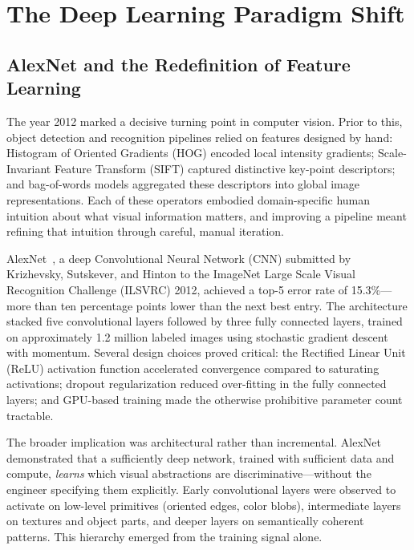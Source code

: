 

\section{The Deep Learning Paradigm Shift}

\subsection{AlexNet and the Redefinition of Feature Learning}

The year 2012 marked a decisive turning point in computer vision.
Prior to this, object detection and recognition pipelines relied
on features designed by hand: Histogram of Oriented Gradients
(HOG) encoded local intensity gradients; Scale-Invariant Feature
Transform (SIFT) captured distinctive key-point descriptors;
and bag-of-words models aggregated these descriptors into global
image representations. Each of these operators embodied
domain-specific human intuition about what visual information
matters, and improving a pipeline meant refining that intuition
through careful, manual iteration.

AlexNet~\cite{krizhevsky2012alexnet}, a deep Convolutional Neural
Network (CNN) submitted by Krizhevsky, Sutskever, and Hinton to
the ImageNet Large Scale Visual Recognition Challenge (ILSVRC)
2012, achieved a top-5 error rate of 15.3\%---more than ten
percentage points lower than the next best entry. The architecture
stacked five convolutional layers followed by three fully connected
layers, trained on approximately 1.2 million labeled images using
stochastic gradient descent with momentum. Several design choices
proved critical: the Rectified Linear Unit (ReLU) activation
function accelerated convergence compared to saturating
activations; dropout regularization reduced over-fitting in the
fully connected layers; and GPU-based training made the otherwise
prohibitive parameter count tractable.

The broader implication was architectural rather than incremental.
AlexNet demonstrated that a sufficiently deep network, trained
with sufficient data and compute, \emph{learns} which visual
abstractions are discriminative---without the engineer specifying
them explicitly. Early convolutional layers were observed to
activate on low-level primitives (oriented edges, color blobs),
intermediate layers on textures and object parts, and deeper
layers on semantically coherent patterns. This hierarchy emerged
from the training signal alone.

